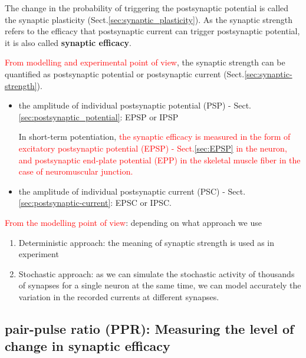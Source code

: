 The change in the probability of triggering the postsynaptic potential is called
the synaptic plasticity (Sect.\ref{sec:synaptic_plasticity}). As the synaptic
strength refers to the efficacy that postsynaptic current can trigger
postsynaptic potential, it is also called {\bf synaptic efficacy}.
 

\textcolor{red}{From modelling and experimental point of view}, the synaptic
strength can be quantified as postsynaptic potential or postsynaptic current
(Sect.\ref{sec:synaptic-strength}).
\begin{itemize}
  \item the amplitude of individual postsynaptic potential (PSP) -
  Sect.\ref{sec:postsynaptic_potential}: EPSP or IPSP

In short-term potentiation, \textcolor{red}{the synaptic efficacy is measured in
the form of excitatory postsynaptic potential (EPSP) - Sect.\ref{sec:EPSP} in
the neuron, and postsynaptic end-plate potential (EPP) in the skeletal muscle
fiber in the case of  neuromuscular junction.}
  
  \item the amplitude of individual postsynaptic current (PSC) - 
  Sect.\ref{sec:postsynaptic-current}: EPSC or IPSC.
  
\end{itemize}


\textcolor{red}{From the modelling point of view}: depending on what approach we
use
\begin{enumerate}
  \item Deterministic approach: the meaning of synaptic strength is used as in
  experiment
  
  \item Stochastic approach: as we can simulate the stochastic activity of
  thousands of synapses for a single neuron at the same time, we can model
  accurately the variation in the recorded currents at different synapses.
\end{enumerate}

\subsection{pair-pulse ratio (PPR): Measuring the level of change in synaptic
efficacy}
\label{sec:pair-pulse-ratio}

